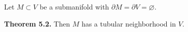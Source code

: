Let $M \subset V$ be a submanifold with $\partial M = \partial V = \varnothing$.

\textbf{Theorem 5.2.} Then $M$ has a tubular neighborhood in $V$.
